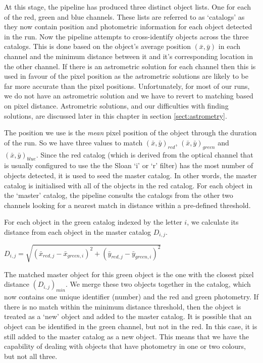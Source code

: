 At this stage, the pipeline has produced three distinct object lists. One for each of the red, green and blue channels. These lists are referred to as `catalogs' as they now contain position and photometric information for each object detected in the run.  Now the pipeline attempts to cross-identify objects across the three catalogs. This is done based on the object's average position $(\bar{x}, \bar{y})$ in each channel and the minimum distance between it and it's corresponding location in the other channel. If there is an astrometric solution for each channel then this is used in favour of the pixel position as the astrometric solutions are likely to be far more accurate than the pixel positions. Unfortunately, for most of our runs, we do not have an astrometric solution and we have to revert to matching based on pixel distance. Astrometric solutions, and our difficulties with finding solutions, are discussed later in this chapter in section \ref{sect:astrometry}.

The position we use is the \emph{mean} pixel position of the object through the duration of the run. So we have three values to match $(\bar{x}, \bar{y})_{red}$, $(\bar{x}, \bar{y})_{green}$ and $(\bar{x}, \bar{y})_{blue}$. Since the red catalog (which is derived from the optical channel that is usually configured to use the the Sloan `i' or `r' filter) has the most number of objects detected, it is used to seed the master catalog. In other words, the master catalog is initialised with all of the objects in the red catalog. For each object in the `master' catalog, the pipeline consults the catalogs from the other two channels looking for a nearest match in distance within a pre-defined threshold.

For each object in the green catalog indexed by the letter $i$, we calculate its distance from each object in the master catalog $D_{i,j}$. 

$D_{i,j} = \sqrt{(\bar{x}_{red, j}-\bar{x}_{green, i})^2 + (\bar{y}_{red, j}-\bar{y}_{green, i})^2}$ 

The matched master object for this green object is the one with the closest pixel distance $(D_{i,j})_{min}$. We merge these two objects together in the catalog, which now contains one unique identifier (number) and the red and green photometry. If there is no match within the minimum distance threshold, then the object is treated as a `new' object and added to the master catalog. It is possible that an object can be identified in the green channel, but not in the red. In this case, it is still added to the master catalog as a new object. This means that we have the capability of dealing with objects that have photometry in one or two colours, but not all three. 

